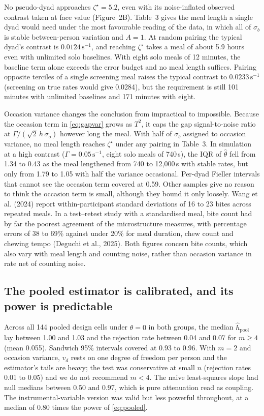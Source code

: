 \documentclass[12pt]{article}
\begin{document}
No pseudo-dyad approaches $\zeta^\star=5.2$, even with its noise-inflated observed
contrast taken at face value (Figure~2B). Table~3 gives the meal length a single
dyad would need under the most favourable reading of the data, in which all of
$\sigma_b$ is stable between-person variation and $A=1$. At random pairing the
typical dyad's contrast is $0.0124\,\mathrm{s}^{-1}$, and reaching $\zeta^\star$
takes a meal of about 5.9 hours even with unlimited solo baselines. With eight
solo meals of 12 minutes, the baseline term alone exceeds the error budget and no
meal length suffices. Pairing opposite terciles of a single screening meal raises
the typical contrast to $0.0233\,\mathrm{s}^{-1}$ (screening on true rates would
give 0.0284), but the requirement is still 101 minutes with unlimited baselines and
171 minutes with eight.

Occasion variance changes the conclusion from impractical to impossible. Because
the occasion term in \eqref{eq:gapvar} grows as $T^2$, it caps the gap
signal-to-noise ratio at $\Gamma/(\sqrt2\,h\,\sigma_o)$ however long the meal. With
half of $\sigma_b$ assigned to occasion variance, no meal length reaches
$\zeta^\star$ under any pairing in Table~3. In simulation at a high contrast
($\Gamma=0.05\,\mathrm{s}^{-1}$, eight solo meals of 740\,s), the IQR of $\hat\theta$ fell from 1.34 to 0.43 as
the meal lengthened from 740 to 12{,}000\,s with stable rates, but only from 1.79 to
1.05 with half the variance occasional. Per-dyad Fieller intervals that cannot
see the occasion term covered at 0.59. Other samples give no reason to think the
occasion term is small, although they bound it only loosely. Wang et al. (2024)
report within-participant standard deviations of 16 to 23 bites across repeated
meals. In a test--retest study with a standardised meal, bite count had by far the
poorest agreement of the microstructure measures, with percentage errors of 38 to
69\% against under 20\% for meal duration, chew count and chewing tempo (Deguchi et
al., 2025). Both figures concern bite counts, which also vary with meal length and
counting noise, rather than occasion variance in rate net of counting noise.

\subsection*{The pooled estimator is calibrated, and its power is predictable}

Across all 144 pooled design cells under $\theta=0$ in both groups, the median
$\hat h_{\mathrm{pool}}$ lay between 1.00 and 1.03 and the rejection rate between
0.04 and 0.07 for $m\geq4$ (mean 0.055). Sandwich 95\% intervals covered at 0.93 to
0.96. With $m=2$ and occasion variance, $v_d$ rests on one degree of freedom per
person and the estimator's tails are heavy; the test was conservative at small
$n$ (rejection rates 0.01 to 0.05) and we do not recommend $m<4$. The naive least-squares slope had null medians
between 0.50 and 0.97, which is pure attenuation read as coupling. The
instrumental-variable version was valid but less powerful throughout, at a median
of 0.80 times the power of \eqref{eq:pooled}.
\end{document}
